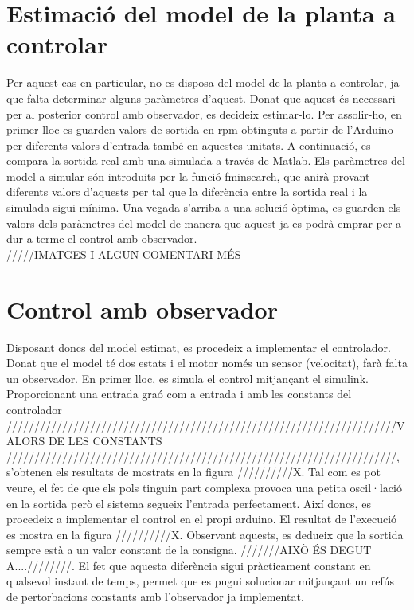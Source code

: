 \documentclass[]{article}
\begin{document}
\section{Estimació del model de la planta a controlar}

Per aquest cas en particular, no es disposa del model de la planta a controlar, ja que falta determinar alguns paràmetres d'aquest. Donat que aquest és necessari per al posterior control amb observador, es decideix estimar-lo. Per assolir-ho, en primer lloc es guarden valors de sortida en rpm obtinguts a partir de l'Arduino per diferents valors d'entrada també en aquestes unitats. A continuació, es compara la sortida real amb una simulada a través de Matlab. Els paràmetres del model a simular són introduits per la funció fminsearch, que anirà provant diferents valors d'aquests per tal que la diferència entre la sortida real i la simulada sigui mínima. Una vegada s'arriba a una solució òptima, es guarden els valors dels paràmetres del model de manera que aquest ja es podrà emprar per a dur a terme el control amb observador. \\

/////IMATGES I ALGUN COMENTARI MÉS

\section{Control amb observador}

Disposant doncs del model estimat, es procedeix a implementar el controlador. Donat que el model té dos estats i el motor només un sensor (velocitat), farà falta un observador. En primer lloc, es simula el control mitjançant el simulink. Proporcionant una entrada graó com a entrada i amb les constants del controlador //////////////////////////////////////////////////////////////////////VALORS DE LES CONSTANTS //////////////////////////////////////////////////////////////////////, s'obtenen els resultats de mostrats en la figura //////////X. Tal com es pot veure, el fet de que els pols tinguin part complexa provoca una petita oscil·lació en la sortida però el sistema segueix l'entrada perfectament. Així doncs, es procedeix a implementar el control en el propi arduino. El resultat de l'execució es mostra en la figura //////////X. Observant aquests, es dedueix que la sortida sempre està a un valor constant de la consigna. ///////AIXÒ ÉS DEGUT A....////////. El fet que aquesta diferència sigui pràcticament constant en qualsevol instant de temps, permet que es pugui solucionar mitjançant un refús de pertorbacions constants amb l'observador ja implementat. \\ 
\end{document}
